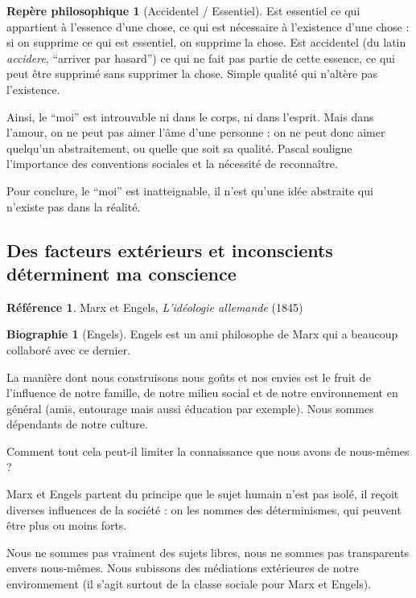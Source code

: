 \documentclass[french]{book}
\theoremstyle{definition}
\newtheorem*{refe}{Référence}
\newtheorem*{rep}{Repère philosophique}
\newtheorem*{bio}{Biographie}
\begin{document}
\begin{rep}[Accidentel / Essentiel]
Est essentiel ce qui appartient à l’essence d’une chose, ce qui est nécessaire à l’existence d’une chose : si on supprime ce qui est essentiel, on supprime la chose.
Est accidentel (du latin \textit{accidere}, “arriver par hasard”) ce qui ne fait pas partie de cette essence, ce qui peut être supprimé sans supprimer la chose. Simple qualité qui n’altère pas l’existence.
\end{rep}


Ainsi, le “moi” est introuvable ni dans le corps, ni dans l’esprit. Mais dans l’amour, on ne peut pas aimer l’âme d’une personne : on ne peut donc aimer quelqu’un abstraitement, ou quelle que soit sa qualité. 
Pascal souligne l’importance des conventions sociales et la nécessité de reconnaître.

Pour conclure, le “moi” est inatteignable, il n’est qu’une idée abstraite qui n’existe pas dans la réalité.

\subsection{Des facteurs extérieurs et inconscients déterminent ma conscience}

\begin{refe}
	Marx et Engels, \textit{L'idéologie allemande} (1845)
\end{refe}

\begin{bio}[Engels]
	Engels est un ami philosophe de Marx qui a beaucoup collaboré avec ce dernier.
\end{bio}

La manière dont nous construisons nous goûts et nos envies est le fruit de l'influence de notre famille, de notre milieu social et de notre environnement en général (amis, entourage mais aussi éducation par exemple). Nous sommes dépendants de notre culture.

Comment tout cela peut-il limiter la connaissance que nous avons de nous-mêmes ?

Marx et Engels partent du principe que le sujet humain n'est pas isolé, il reçoit diverses influences de la société : on les nommes des déterminismes, qui peuvent être plus ou moins forts.

Nous ne sommes pas vraiment des sujets libres, nous ne sommes pas transparents envers nous-mêmes. Nous subissons des médiations extérieures de notre environnement (il s'agit surtout de la classe sociale pour Marx et Engels). 
\end{document}
